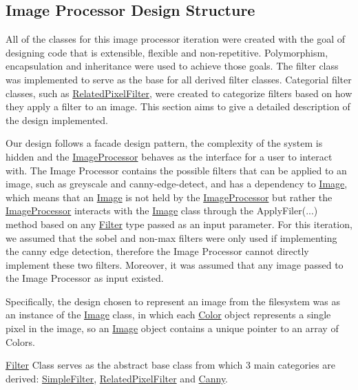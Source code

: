 \subsection*{Image Processor Design Structure}

All of the classes for this image processor iteration were created with the goal of designing code that is extensible, flexible and non-\/repetitive. Polymorphism, encapsulation and inheritance were used to achieve those goals. The filter class was implemented to serve as the base for all derived filter classes. Categorial filter classes, such as \hyperlink{classRelatedPixelFilter}{Related\+Pixel\+Filter}, were created to categorize filters based on how they apply a filter to an image. This section aims to give a detailed description of the design implemented.

Our design follows a facade design pattern, the complexity of the system is hidden and the \hyperlink{classImageProcessor}{Image\+Processor} behaves as the interface for a user to interact with. The Image Processor contains the possible filters that can be applied to an image, such as {\ttfamily greyscale} and {\ttfamily canny-\/edge-\/detect}, and has a dependency to \hyperlink{classImage}{Image}, which means that an \hyperlink{classImage}{Image} is not held by the \hyperlink{classImageProcessor}{Image\+Processor} but rather the \hyperlink{classImageProcessor}{Image\+Processor} interacts with the \hyperlink{classImage}{Image} class through the {\ttfamily Apply\+Filer(...)} method based on any \hyperlink{classFilter}{Filter} type passed as an input parameter. For this iteration, we assumed that the {\ttfamily sobel} and {\ttfamily non-\/max} filters were only used if implementing the canny edge detection, therefore the Image Processor cannot directly implement these two filters. Moreover, it was assumed that any image passed to the Image Processor as input existed.



Specifically, the design chosen to represent an image from the filesystem was as an instance of the \hyperlink{classImage}{Image} class, in which each \hyperlink{classColor}{Color} object represents a single pixel in the image, so an \hyperlink{classImage}{Image} object contains a unique pointer to an array of Colors.



\hyperlink{classFilter}{Filter} Class serves as the abstract base class from which 3 main categories are derived\+: \hyperlink{classSimpleFilter}{Simple\+Filter}, \hyperlink{classRelatedPixelFilter}{Related\+Pixel\+Filter} and \hyperlink{classCanny}{Canny}.



